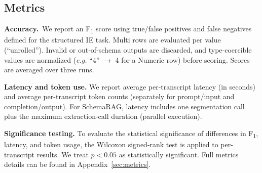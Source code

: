 \documentclass[11pt]{article}
\begin{document}
\subsection{Metrics}

\textbf{Accuracy.}~We report an F\textsubscript{1} score using true/false positives and false negatives defined for the structured IE task.
Multi rows are evaluated per value (“unrolled”). Invalid or out‑of‑schema outputs are discarded, and type‑coercible values are normalized (\textit{e.g.} ``4'' $\rightarrow$ 4 for a Numeric row)  before scoring. Scores are averaged over three runs.


\textbf{Latency and token use.} We report average per-transcript latency (in seconds) and average per-transcript token counts (separately for prompt/input and completion/output).
For SchemaRAG, latency includes one segmentation call plus the maximum extraction‑call duration (parallel execution).


\textbf{Significance testing.} To evaluate the statistical significance of differences in F\textsubscript{1}, latency, and token usage, the Wilcoxon signed-rank test \cite{wilcoxon1992individual} is applied to 
per-transcript results. 
We treat $p < 0.05$ as statistically significant. 
Full metrics details can be found in Appendix~\ref{sec:metrics}.
\end{document}
